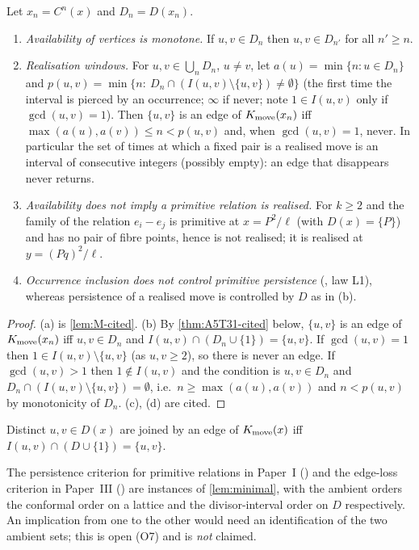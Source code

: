 \begin{proposition}\label{prop:P3}
Let $x_n=C^n(x)$ and $D_n=D(x_n)$.
\begin{enumerate}[label=(\alph*),itemsep=1pt]
\item \emph{Availability of vertices is monotone.} If $u,v\in D_n$ then $u,v\in D_{n'}$ for all $n'\ge n$.
\item \emph{Realisation windows.} For $u,v\in\bigcup_nD_n$, $u\ne v$, let $a(u)=\min\{n:u\in D_n\}$ and $p(u,v)=\min\{n:\ D_n\cap(I(u,v)\setminus\{u,v\})\ne\emptyset\}$ (the first time the interval is pierced by an occurrence; $\infty$ if never; note $1\in I(u,v)$ only if $\gcd(u,v)=1$). Then $\{u,v\}$ is an edge of $K_{\mathrm{move}}(x_n)$ iff $\max(a(u),a(v))\le n<p(u,v)$ and, when $\gcd(u,v)=1$, never. In particular the set of times at which a fixed pair is a realised move is an interval of consecutive integers (possibly empty): an edge that disappears never returns.
\item \emph{Availability does not imply a primitive relation is realised.} For $k\ge2$ and the family of  the relation $e_i-e_j$ is primitive at $x=P^2/\ell$ (with $D(x)=\{P\}$) and has no pair of fibre points, hence is not realised; it is realised at $y=(Pq)^2/\ell$.
\item \emph{Occurrence inclusion does not control primitive persistence} (, law L1), whereas persistence of a realised move is controlled by $D$ as in (b).
\end{enumerate}
\end{proposition}
\begin{proof}
(a) is \cref{lem:M-cited}. (b) By \cref{thm:A5T31-cited} below, $\{u,v\}$ is an edge of $K_{\mathrm{move}}(x_n)$ iff $u,v\in D_n$ and $I(u,v)\cap(D_n\cup\{1\})=\{u,v\}$. If $\gcd(u,v)=1$ then $1\in I(u,v)\setminus\{u,v\}$ (as $u,v\ge2$), so there is never an edge. If $\gcd(u,v)>1$ then $1\notin I(u,v)$ and the condition is $u,v\in D_n$ and $D_n\cap(I(u,v)\setminus\{u,v\})=\emptyset$, i.e.\ $n\ge\max(a(u),a(v))$ and $n<p(u,v)$ by monotonicity of $D_n$. (c), (d) are cited.
\end{proof}
\begin{theorem}\label{thm:A5T31-cited}
Distinct $u,v\in D(x)$ are joined by an edge of $K_{\mathrm{move}}(x)$ iff $I(u,v)\cap(D\cup\{1\})=\{u,v\}$.
\end{theorem}
\begin{corollary}\label{cor:S4}
The persistence criterion for primitive relations in Paper~I () and the edge-loss criterion in Paper~III () are instances of \cref{lem:minimal}, with the ambient orders the conformal order on a lattice and the divisor-interval order on $D$ respectively. An implication from one to the other would need an identification of the two ambient sets; this is open (O7) and is \emph{not} claimed.
\end{corollary}
